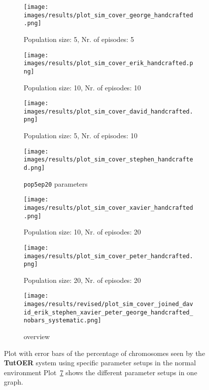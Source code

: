 \begin{figure}[ht]
	\begin{subfigure}{0.48\linewidth}
	\texttt{[image: images/results/plot\_sim\_cover\_george\_handcrafted.png]}
	\caption{Population size: 5, Nr. of episodes: 5}
	\label{fig:cover_handcrafted_george}
	\end{subfigure}
	\hfill
	\begin{subfigure}{0.48\linewidth}
	\texttt{[image: images/results/plot\_sim\_cover\_erik\_handcrafted.png]}
	\caption{Population size: 10, Nr. of episodes: 10}
	\label{fig:cover_handcrafted_erik}
	\end{subfigure}
	\begin{subfigure}{0.48\linewidth}
	\texttt{[image: images/results/plot\_sim\_cover\_david\_handcrafted.png]}
	\caption{Population size: 5, Nr. of episodes: 10}
	\label{fig:cover_handcrafted_david}
	\end{subfigure}
	\hfill
	\begin{subfigure}{0.48\linewidth}
	\texttt{[image: images/results/plot\_sim\_cover\_stephen\_handcrafted.png]}
	\caption{\texttt{pop5ep20} parameters}
	\label{fig:cover_handcrafted_stephen}
	\end{subfigure}
	\begin{subfigure}{0.48\linewidth}
	\texttt{[image: images/results/plot\_sim\_cover\_xavier\_handcrafted.png]}
	\caption{Population size: 10, Nr. of episodes: 20}
	\label{fig:cover_handcrafted_xavier}
	\end{subfigure}
	\hfill
	\begin{subfigure}{0.48\linewidth}
	\texttt{[image: images/results/plot\_sim\_cover\_peter\_handcrafted.png]}
	\caption{Population size: 20, Nr. of episodes: 20}
	\label{fig:cover_handcrafted_peter}
	\end{subfigure}
	\begin{subfigure}{\linewidth}
	\texttt{[image: images/results/revised/plot\_sim\_cover\_joined\_david\_erik\_stephen\_xavier\_peter\_george\_handcrafted\_nobars\_systematic.png]}
	\caption{overview}
	\label{fig:cover_handcrafted_overview_group1}
	\end{subfigure}
	\caption[Percentage seen in normal simulated environment for group 1]{Plot with error bars of the percentage of chromosomes seen by the \textbf{TutOER}
	system using specific parameter setups in the normal environment
	Plot~\ref{fig:cover_handcrafted_overview_group1} shows the
	different parameter setups in one graph.}
	\label{fig:cover_handcrafted_container_group1}
\end{figure}


